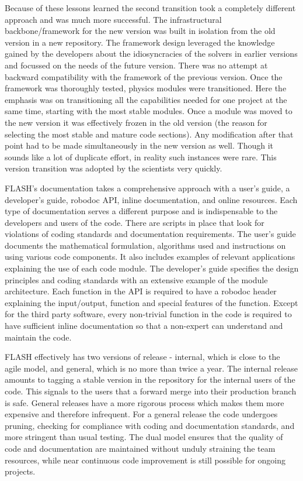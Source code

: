 Because of these lessons learned the second transition took a
completely different approach and was much more successful. The
infrastructural backbone/framework for the new version was built in
isolation from the old version in a new repository. The framework design
leveraged the knowledge gained by the developers about the
idiosyncracies of the solvers in earlier versions and focussed on
the needs of the future version. There was no attempt at backward
compatibility with the framework of the previous version. Once the
framework was thoroughly tested, physics modules were
transitioned. Here the emphasis was on transitioning all the
capabilities needed for one project at the same time, starting with
the most stable modules. Once a module was moved to the new version it
was effectively frozen in the old version (the reason for selecting
the most stable and mature code sections). Any modification after that
point had to be made simultaneously in the new version as well. Though
it sounds like a lot of duplicate effort, in reality such instances
were rare. This version transition was adopted by the scientists very quickly.

FLASH's documentation takes a comprehensive approach with a
user's guide, a developer's guide, robodoc API, inline documentation,
and online resources. Each type of documentation serves a different
purpose and is indispensable to the developers and users of the code.  
There are scripts in place that look for violations of coding
standards and documentation requirements. The user's guide documents the
mathematical formulation, algorithms used and instructions on using
various code components. It also includes examples of
relevant applications explaining the use of each code module. The
developer's guide specifies the design principles and coding standards
with an extensive example of the module architecture. Each function in
the API is required to have a robodoc header explaining the
input/output, function and special features of the function. Except
for the third party software, every non-trivial function in the code
is required to have sufficient inline documentation so that a non-expert
can understand and maintain the code.

FLASH effectively has two versions of release - internal, which
is close to the agile model, and general, which is no more than twice
a year. The internal release amounts to tagging a stable version in
the repository for the internal users of the code. This signals to
the users that a forward merge into their production branch is
safe. General releases have a more rigorous process which makes
them more expensive and therefore infrequent. For a general release the code undergoes 
pruning, checking for compliance with coding and
documentation standards, and more stringent than usual testing. The dual
model ensures that the quality of code and documentation are
maintained without unduly straining the team resources, while 
near continuous code improvement is still possible for ongoing
projects. 
 
